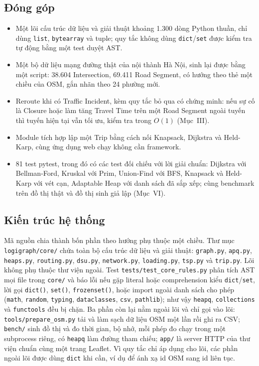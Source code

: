 \subsection{Đóng góp}

\begin{itemize}
\item Một lõi cấu trúc dữ liệu và giải thuật khoảng 1.300 dòng Python thuần, chỉ dùng \texttt{list}, \texttt{bytearray} và tuple; quy tắc không dùng \texttt{dict}/\texttt{set} được kiểm tra tự động bằng một test duyệt AST.
\item Một bộ dữ liệu mạng đường thật của nội thành Hà Nội, sinh lại được bằng một script: 38.604 Intersection, 69.411 Road Segment, có hướng theo thẻ một chiều của OSM, gắn nhãn theo 24 phường mới.
\item Reroute khi có Traffic Incident, kèm quy tắc bỏ qua có chứng minh: nếu sự cố là Closure hoặc làm tăng Travel Time trên một Road Segment ngoài tuyến thì tuyến hiện tại vẫn tối ưu, kiểm tra trong $O(1)$ (Mục~III).
\item Module tích hợp lập một Trip bằng cách nối Knapsack, Dijkstra và Held-Karp, cùng ứng dụng web chạy không cần framework.
\item 81 test pytest, trong đó có các test đối chiếu với lời giải chuẩn: Dijkstra với Bellman-Ford, Kruskal với Prim, Union-Find với BFS, Knapsack và Held-Karp với vét cạn, Adaptable Heap với danh sách đã sắp xếp; cùng benchmark trên đồ thị thật và đồ thị sinh giả lập (Mục~VI).
\end{itemize}

\subsection{Kiến trúc hệ thống}

Mã nguồn chia thành bốn phần theo hướng phụ thuộc một chiều. Thư mục \texttt{logigraph/core/} chứa toàn bộ cấu trúc dữ liệu và giải thuật: \texttt{graph.py}, \texttt{apq.py}, \texttt{heaps.py}, \texttt{routing.py}, \texttt{dsu.py}, \texttt{network.py}, \texttt{loading.py}, \texttt{tsp.py} và \texttt{trip.py}. Lõi không phụ thuộc thư viện ngoài. Test \texttt{tests/test\_core\_rules.py} phân tích AST mọi file trong \texttt{core/} và báo lỗi nếu gặp literal hoặc comprehension kiểu \texttt{dict}/\texttt{set}, lời gọi \texttt{dict()}, \texttt{set()}, \texttt{frozenset()}, hoặc import ngoài danh sách cho phép (\texttt{math}, \texttt{random}, \texttt{typing}, \texttt{dataclasses}, \texttt{csv}, \texttt{pathlib}); như vậy \texttt{heapq}, \texttt{collections} và \texttt{functools} đều bị chặn. Ba phần còn lại nằm ngoài lõi và chỉ gọi vào lõi: \texttt{tools/prepare\_osm.py} tải và làm sạch dữ liệu OSM một lần rồi ghi ra CSV; \texttt{bench/} sinh đồ thị và đo thời gian, bộ nhớ, mỗi phép đo chạy trong một subprocess riêng, có \texttt{heapq} làm đường tham chiếu; \texttt{app/} là server HTTP của thư viện chuẩn cùng một trang Leaflet. Vì quy tắc chỉ áp dụng cho lõi, các phần ngoài lõi được dùng \texttt{dict} khi cần, ví dụ để ánh xạ id OSM sang id liên tục.

